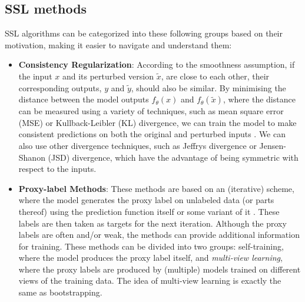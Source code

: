 \subsection*{SSL methods}
SSL algorithms can be categorized into these following groups based on their motivation, making it easier to navigate and understand them\cite{ssl-overview-2020}:
\begin{itemize}
        \item \textbf{Consistency Regularization}: According to the smoothness assumption, if the input $x$ and its perturbed version $\tilde{x}$, 
        are close to each other, their corresponding outputs, $y$ and $\tilde{y}$, should also be similar. By minimising the distance between the model outputs
        $f_\theta(x)$ and $f_\theta(\tilde{x})$, where the distance can be measured using a variety of techniques, such as mean square error (MSE) or 
        Kullback-Leibler (KL) divergence, we can train the model to make consistent predictions on both the original and perturbed inputs
        \cite{temporal-ensembling-2017,regularization-&-pertrubations-2016}.
        We can also use other divergence techniques, such as Jeffrys divergence or Jensen-Shanon (JSD) divergence, which have the advantage of 
        being symmetric with respect to the inputs.
    \item \textbf{Proxy-label Methods}: These methods are based on an (iterative) scheme, where the model generates the proxy label on unlabeled data (or parts 
        thereof) using the prediction function itself or some variant of it \cite{psuedo-label-2013}. These labels are then taken as targets for the next iteration. Although the proxy labels
        are often and/or weak, the methods can provide additional information for training. These methods can be divided into two groups: self-training, where
        the model produces the proxy label itself, and \textit{multi-view learning}, where the proxy labels are produced by (multiple) models trained on different 
        views of the training data. The idea of multi-view learning is exactly the same as bootstrapping.



\end{itemize}
